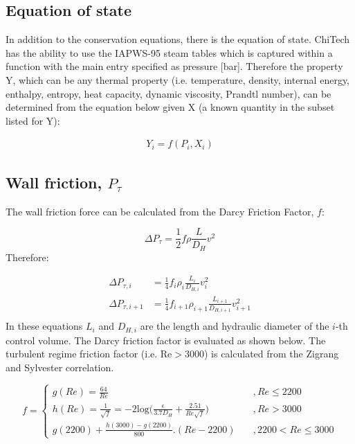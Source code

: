 \documentclass[11pt,letterpaper,titlepage]{article}
\newcommand{\half}{\frac{1}{2}}
\begin{document}
\subsection{Equation of state}
In addition to the conservation equations, there is the equation of state. ChiTech has the ability to use the IAPWS-95 steam tables which is captured within
a function with the main entry specified as pressure [bar]. Therefore the property Y, which can be any thermal property (i.e. temperature, density, 
internal energy, enthalpy, entropy, heat capacity, dynamic viscosity, Prandtl number), can be determined from the equation below given X (a known quantity in the subset listed for Y):

\begin{equation}
\begin{aligned}
Y_i=f(P_i,X_i)
\end{aligned}
\end{equation}



\newpage
\subsection{Wall friction, $P_{\tau}$}
The wall friction force can be calculated from the Darcy Friction Factor, $f$:

\begin{equation*}
\Delta P_{\tau}=\half f \rho \frac{L}{D_H} v^2
\end{equation*} 
\noindent Therefore:

\begin{equation*}
\begin{aligned}
\Delta P_{\tau,i}&=\frac{1}{4} f_i \rho_i \frac{L_i}{D_{H,i}} v_i^2 \\
\Delta P_{\tau,i+1}&=\frac{1}{4} f_{i+1} \rho_{i+1} \frac{L_{i+1}}{D_{H,i+1}} v_{i+1}^2 \\
\end{aligned}
\end{equation*}
\newline
\noindent
In these equations $L_i$ and $D_{H,i}$ are the length and hydraulic diameter of the $i$-th control volume. The Darcy friction factor is evaluated as shown below. The turbulent regime friction factor (i.e. Re$>$3000) is calculated from the Zigrang and Sylvester correlation.

\begin{equation*}
f=
\begin{cases}
g(Re)=\frac{64}{Re} \quad &,Re\le 2200 \\
h(Re)=\frac{1}{\sqrt{f}}=-2\textrm{log}\biggr( \frac{\epsilon}{3.7D_H}  + \frac{2.51}{Re \sqrt{f}}   \biggr)     \quad &,Re>3000 \\
g(2200)+\frac{h(3000)-g(2200)}{800}. (Re-2200)   \quad &, 2200<Re\le 3000
\end{cases}
\end{equation*}
\end{document}
